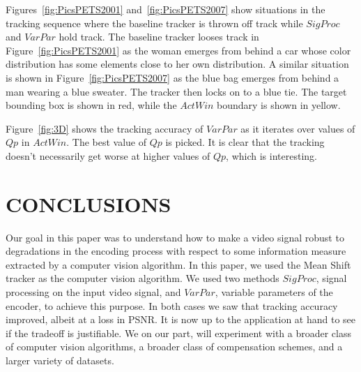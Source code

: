 \documentclass{article}
\begin{document}
Figures~\ref{fig:PicsPETS2001} and~\ref{fig:PicsPETS2007} show situations in the tracking sequence where the baseline tracker is thrown off track while $SigProc$ and $VarPar$ hold track.  The baseline tracker looses track in Figure~\ref{fig:PicsPETS2001} as the woman emerges from behind a car whose color distribution has some elements close to her own distribution.  A similar situation is shown in Figure~\ref{fig:PicsPETS2007} as the blue bag emerges from behind a man wearing a blue sweater.  The tracker then locks on to a blue tie.  The target bounding box is shown in red, while the $ActWin$ boundary is shown in yellow.  

Figure~\ref{fig:3D} shows the tracking accuracy of $VarPar$ as it iterates over values of $Qp$ in $ActWin$.  The best value of $Qp$ is picked.  It is clear that the tracking doesn't necessarily get worse at higher values of $Qp$, which is interesting.  
\\

\section{CONCLUSIONS}
Our goal in this paper was to understand how to make a video signal robust to degradations in the encoding process with respect to some information measure extracted by a computer vision algorithm.  In this paper, we used the Mean Shift tracker as the computer vision algorithm.  We used two methods $SigProc$, signal processing on the input video signal, and $VarPar$, variable parameters of the encoder, to achieve this purpose.  In both cases we saw that tracking accuracy improved, albeit at a loss in PSNR.  It is now up to the application at hand to see if the tradeoff is justifiable.  We on our part, will experiment with a broader class of computer vision algorithms, a broader class of compensation schemes, and a larger variety of datasets.



\end{document}
